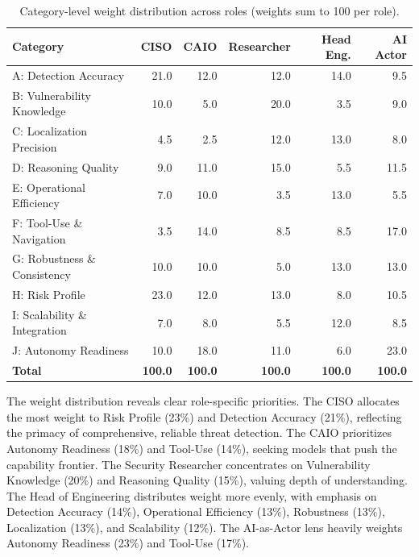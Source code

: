 \documentclass[10pt,twocolumn]{article}
\begin{document}
\begin{table}[t]
\centering
\caption{Category-level weight distribution across roles (weights sum to 100 per role).}
\label{tab:category_weights}
\small
\begin{tabular}{@{}l r r r r r@{}}
\toprule
\textbf{Category} & \textbf{CISO} & \textbf{CAIO} & \textbf{Researcher} & \textbf{Head Eng.} & \textbf{AI Actor} \\
\midrule
A: Detection Accuracy        & 21.0 & 12.0 & 12.0 & 14.0 &  9.5 \\
B: Vulnerability Knowledge   & 10.0 &  5.0 & 20.0 &  3.5 &  9.0 \\
C: Localization Precision    &  4.5 &  2.5 & 12.0 & 13.0 &  8.0 \\
D: Reasoning Quality         &  9.0 & 11.0 & 15.0 &  5.5 & 11.5 \\
E: Operational Efficiency    &  7.0 & 10.0 &  3.5 & 13.0 &  5.5 \\
F: Tool-Use \& Navigation    &  3.5 & 14.0 &  8.5 &  8.5 & 17.0 \\
G: Robustness \& Consistency & 10.0 & 10.0 &  5.0 & 13.0 & 13.0 \\
H: Risk Profile              & 23.0 & 12.0 & 13.0 &  8.0 & 10.5 \\
I: Scalability \& Integration&  7.0 &  8.0 &  5.5 & 12.0 &  8.5 \\
J: Autonomy Readiness        & 10.0 & 18.0 & 11.0 &  6.0 & 23.0 \\
\midrule
\textbf{Total}               & \textbf{100.0} & \textbf{100.0} & \textbf{100.0} & \textbf{100.0} & \textbf{100.0} \\
\bottomrule
\end{tabular}
\end{table}

The weight distribution reveals clear role-specific priorities. The CISO allocates the most weight to Risk Profile (23\%) and Detection Accuracy (21\%), reflecting the primacy of comprehensive, reliable threat detection. The CAIO prioritizes Autonomy Readiness (18\%) and Tool-Use (14\%), seeking models that push the capability frontier. The Security Researcher concentrates on Vulnerability Knowledge (20\%) and Reasoning Quality (15\%), valuing depth of understanding. The Head of Engineering distributes weight more evenly, with emphasis on Detection Accuracy (14\%), Operational Efficiency (13\%), Robustness (13\%), Localization (13\%), and Scalability (12\%). The AI-as-Actor lens heavily weights Autonomy Readiness (23\%) and Tool-Use (17\%).
\end{document}
